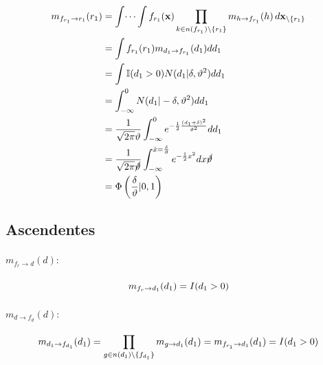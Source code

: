 \documentclass[11pt,twoside,spanish]{report} %
\begin{document}
\begin{equation}
	\begin{split}
		m_{f_{r_1} \rightarrow r_1}(r_1) & = \int \dots \int f_{r_1}(\textbf{x}) \prod_{k\in n(f_{r_1})\backslash\{r_1\}} m_{h \rightarrow f_{r_1}}(h) \, d\textbf{x}_{\backslash \{r_1\}} \\
		& = \int f_{r_1}(r_1) m_{d_1 \rightarrow f_{r_1}}(d_1)  dd_1 \\
		& = \int \mathbb{I}(d_1 > 0) N(d_1 \vert \delta, \vartheta^2)  dd_1 \\
		& = \int_{-\infty}^0  N(d_1 \vert -\delta, \vartheta^2)  dd_1 \\
		&=\frac{1}{\sqrt{2\pi}\vartheta} \int_{-\infty}^0e^{-\frac{1}{2}\frac{(d_1+\delta)^2}{ \vartheta^2}}dd_1\\
		&=\frac{1}{\sqrt{2\pi}\cancel{\vartheta}} \int_{-\infty}^{\hat{x}=\frac{\delta}{\vartheta}}e^{-\frac{1}{2}x^2}dx\cancel{\vartheta}\\
		& = \Phi\left(\frac{\delta}{\vartheta}\vert0,1\right)
	\end{split}
\end{equation}







\subsection{\textbf{Ascendentes}}
\label{appendix:mensajesB}
\paragraph{$m_{f_{r}\rightarrow d}(d):$}

\begin{equation}
	\centering
	m_{f_{r}\rightarrow d_1}(d_1) = I(d_1>0)
\end{equation}

\paragraph{$m_{d\rightarrow f_{d}}(d):$}

\begin{equation}
	\centering
	m_{d_1\rightarrow f_{d_1}}(d_1) = \prod_{g\in n(d_1)\backslash\{f_{d_1}\}} m_{g\rightarrow d_1}(d_1)
	= m_{f_{r_1}\rightarrow d_1}(d_1)
	=  I(d_1>0)
\end{equation}
\end{document}
